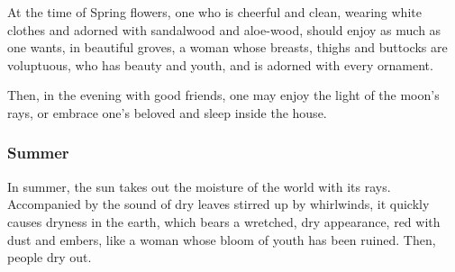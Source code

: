 \begin{translation}
\item[49--50] 
At the time of Spring flowers, %
one who is cheerful %
and clean, %
wearing white clothes and adorned with sandalwood and aloe-wood, should enjoy
as much as one wants, %
in beautiful groves, %
a woman whose breasts, thighs and buttocks are voluptuous, %
who has beauty and youth, and is adorned with every ornament.

\item[51] 
Then, in the evening %
with good friends, %
one may enjoy %
the light of the moon's rays, %
or%
embrace one's beloved and sleep inside the house. %

\subsubsection{Summer}%

\item[52-54]
In summer, %
the sun takes out %
the moisture of the world %
with its rays. %
Accompanied by the sound of dry leaves stirred up %
by whirlwinds, %
it quickly causes dryness %
in the earth, which bears a wretched, dry appearance, red with dust and embers, %
like a woman whose bloom of youth has been ruined. %
Then, people dry out. %


\end{translation}
